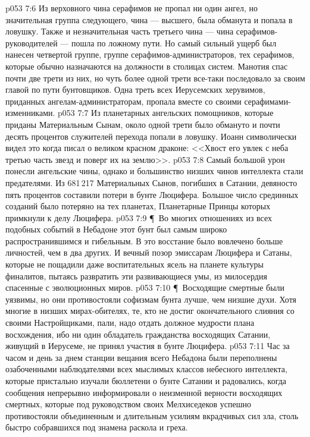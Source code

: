 \vs p053 7:6 Из верховного чина серафимов не пропал ни один ангел, но значительная группа следующего, чина --- высшего, была обманута и попала в ловушку. Также и незначительная часть третьего чина --- чина серафимов\hyp{}руководителей --- пошла по ложному пути. Но самый сильный ущерб был нанесен четвертой группе, группе серафимов\hyp{}администраторов, тех серафимов, которые обычно назначаются на должности в столицах систем. Манотия спас почти две трети из них, но чуть более одной трети все\hyp{}таки последовало за своим главой по пути бунтовщиков. Одна треть всех Иерусемских херувимов, приданных ангелам\hyp{}администраторам, пропала вместе со своими серафимами\hyp{}изменниками.
\vs p053 7:7 Из планетарных ангельских помощников, которые приданы Материальным Сынам, около одной трети было обмануто и почти десять процентов служителей перехода попали в ловушку. Иоанн символически видел это когда писал о великом красном драконе: <<Хвост его увлек с неба третью часть звезд и поверг их на землю>>.
\vs p053 7:8 Самый большой урон понесли ангельские чины, однако и большинство низших чинов интеллекта стали предателями. Из 681\,217 Материальных Сынов, погибших в Сатании, девяносто пять процентов составили потери в бунте Люцифера. Большое число срединных созданий было потеряно на тех планетах, Планетарные Принцы которых примкнули к делу Люцифера.
\vs p053 7:9 \P\ Во многих отношениях из всех подобных событий в Небадоне этот бунт был самым широко распространившимся и гибельным. В это восстание было вовлечено больше личностей, чем в два других. И вечный позор эмиссарам Люцифера и Сатаны, которые не пощадили даже воспитательных ясель на планете культуры финалитов, пытаясь развратить эти развивающиеся умы, из милосердия спасенные с эволюционных миров.
\vs p053 7:10 \P\ Восходящие смертные были уязвимы, но они противостояли софизмам бунта лучше, чем низшие духи. Хотя многие в низших мирах\hyp{}обителях, те, кто не достиг окончательного слияния со своими Настройщиками, пали, надо отдать должное мудрости плана восхождения, ибо ни один обладатель гражданства восходящих Сатании, живущий в Иерусеме, не принял участия в бунте Люцифера.
\vs p053 7:11 Час за часом и день за днем станции вещания всего Небадона были переполнены озабоченными наблюдателями всех мыслимых классов небесного интеллекта, которые пристально изучали бюллетени о бунте Сатании и радовались, когда сообщения непрерывно информировали о неизменной верности восходящих смертных, которые под руководством своих Мелхиседеков успешно противостояли объединенным и длительным усилиям вкрадчивых сил зла, столь быстро собравшихся под знамена раскола и греха.
